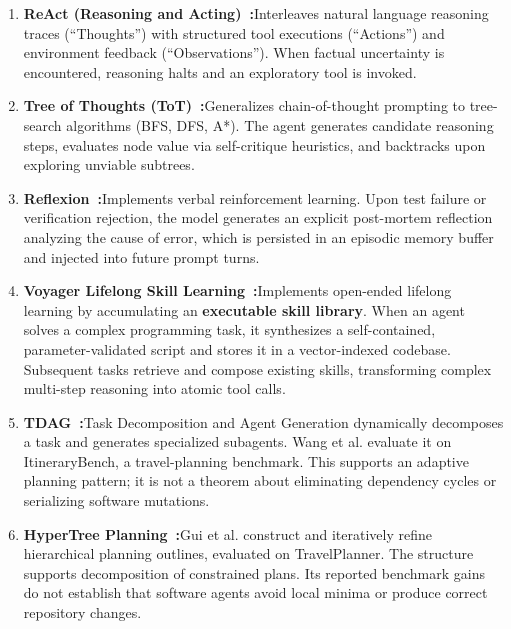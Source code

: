 \begin{enumerate}[leftmargin=1.8em,itemsep=3pt]
  \item \textbf{ReAct (Reasoning and Acting)~:}\enspace Interleaves natural language reasoning traces (``Thoughts'') with structured tool executions (``Actions'') and environment feedback (``Observations''). When factual uncertainty is encountered, reasoning halts and an exploratory tool is invoked.
  
  \item \textbf{Tree of Thoughts (ToT)~:}\enspace Generalizes chain-of-thought prompting to tree-search algorithms (BFS, DFS, A*). The agent generates candidate reasoning steps, evaluates node value via self-critique heuristics, and backtracks upon exploring unviable subtrees.
  
  \item \textbf{Reflexion~:}\enspace Implements verbal reinforcement learning. Upon test failure or verification rejection, the model generates an explicit post-mortem reflection analyzing the cause of error, which is persisted in an episodic memory buffer and injected into future prompt turns.

  \item \textbf{Voyager Lifelong Skill Learning~:}\enspace Implements open-ended lifelong learning by accumulating an \textbf{executable skill library}. When an agent solves a complex programming task, it synthesizes a self-contained, parameter-validated script and stores it in a vector-indexed codebase. Subsequent tasks retrieve and compose existing skills, transforming complex multi-step reasoning into atomic tool calls.

  \item \textbf{TDAG~:}\enspace Task Decomposition and Agent Generation dynamically decomposes a task and generates specialized subagents. Wang et al. evaluate it on ItineraryBench, a travel-planning benchmark. This supports an adaptive planning pattern; it is not a theorem about eliminating dependency cycles or serializing software mutations.

  \item \textbf{HyperTree Planning~:}\enspace Gui et al. construct and iteratively refine hierarchical planning outlines, evaluated on TravelPlanner. The structure supports decomposition of constrained plans. Its reported benchmark gains do not establish that software agents avoid local minima or produce correct repository changes.
\end{enumerate}

